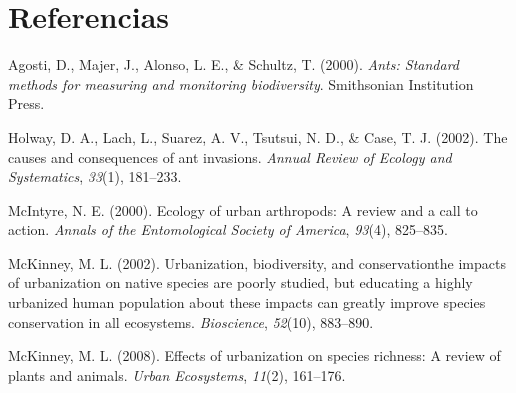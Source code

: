 \documentclass[11pt,]{article}
\begin{document}
\section*{Referencias}\label{referencias}

\hypertarget{refs}{}
\hypertarget{ref-agosti2000ants}{}
Agosti, D., Majer, J., Alonso, L. E., \& Schultz, T. (2000). \emph{Ants:
Standard methods for measuring and monitoring biodiversity}. Smithsonian
Institution Press.

\hypertarget{ref-holway2002causes}{}
Holway, D. A., Lach, L., Suarez, A. V., Tsutsui, N. D., \& Case, T. J.
(2002). The causes and consequences of ant invasions. \emph{Annual
Review of Ecology and Systematics}, \emph{33}(1), 181--233.

\hypertarget{ref-mcintyre2000ecology}{}
McIntyre, N. E. (2000). Ecology of urban arthropods: A review and a call
to action. \emph{Annals of the Entomological Society of America},
\emph{93}(4), 825--835.

\hypertarget{ref-mckinney2002urbanization}{}
McKinney, M. L. (2002). Urbanization, biodiversity, and conservationthe
impacts of urbanization on native species are poorly studied, but
educating a highly urbanized human population about these impacts can
greatly improve species conservation in all ecosystems.
\emph{Bioscience}, \emph{52}(10), 883--890.

\hypertarget{ref-mckinney2008effects}{}
McKinney, M. L. (2008). Effects of urbanization on species richness: A
review of plants and animals. \emph{Urban Ecosystems}, \emph{11}(2),
161--176.




\newpage
\singlespacing 
\end{document}
